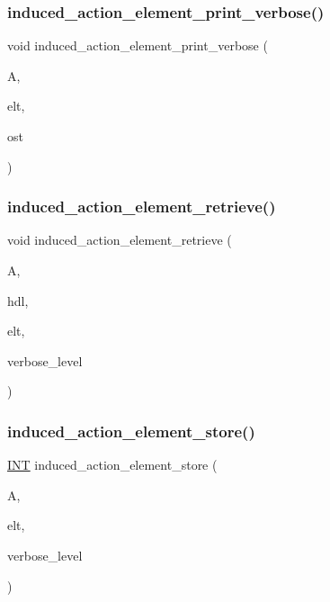 \subsubsection{\texorpdfstring{induced\+\_\+action\+\_\+element\+\_\+print\+\_\+verbose()}{induced\_action\_element\_print\_verbose()}}
{\footnotesize\ttfamily void induced\+\_\+action\+\_\+element\+\_\+print\+\_\+verbose (\begin{DoxyParamCaption}\item[{\mbox{\hyperlink{classaction}{action}} \&}]{A,  }\item[{void $\ast$}]{elt,  }\item[{ostream \&}]{ost }\end{DoxyParamCaption})}

\mbox{\label{interface_8_c_a9e51f4ab67af75d0a12a3eb7f211a5b4}} 
\subsubsection{\texorpdfstring{induced\+\_\+action\+\_\+element\+\_\+retrieve()}{induced\_action\_element\_retrieve()}}
{\footnotesize\ttfamily void induced\+\_\+action\+\_\+element\+\_\+retrieve (\begin{DoxyParamCaption}\item[{\mbox{\hyperlink{classaction}{action}} \&}]{A,  }\item[{\mbox{\hyperlink{galois_8h_a09fddde158a3a20bd2dcadb609de11dc}{I\+NT}}}]{hdl,  }\item[{void $\ast$}]{elt,  }\item[{\mbox{\hyperlink{galois_8h_a09fddde158a3a20bd2dcadb609de11dc}{I\+NT}}}]{verbose\+\_\+level }\end{DoxyParamCaption})}

\mbox{\label{interface_8_c_a23d42fb239ba7e886b1fb9fc96f1a3be}} 
\subsubsection{\texorpdfstring{induced\+\_\+action\+\_\+element\+\_\+store()}{induced\_action\_element\_store()}}
{\footnotesize\ttfamily \mbox{\hyperlink{galois_8h_a09fddde158a3a20bd2dcadb609de11dc}{I\+NT}} induced\+\_\+action\+\_\+element\+\_\+store (\begin{DoxyParamCaption}\item[{\mbox{\hyperlink{classaction}{action}} \&}]{A,  }\item[{void $\ast$}]{elt,  }\item[{\mbox{\hyperlink{galois_8h_a09fddde158a3a20bd2dcadb609de11dc}{I\+NT}}}]{verbose\+\_\+level }\end{DoxyParamCaption})}

